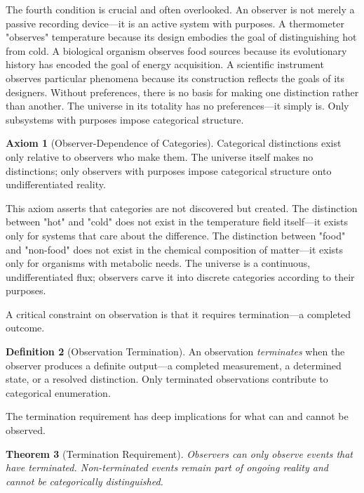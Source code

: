\documentclass[12pt,a4paper]{article}
\newtheorem{theorem}{Theorem}[section]
\theoremstyle{definition}
\newtheorem{definition}[theorem]{Definition}
\newtheorem{axiom}[theorem]{Axiom}
\theoremstyle{remark}
\begin{document}
The fourth condition is crucial and often overlooked. An observer is not merely a passive recording device—it is an active system with purposes. A thermometer "observes" temperature because its design embodies the goal of distinguishing hot from cold. A biological organism observes food sources because its evolutionary history has encoded the goal of energy acquisition. A scientific instrument observes particular phenomena because its construction reflects the goals of its designers. Without preferences, there is no basis for making one distinction rather than another. The universe in its totality has no preferences—it simply is. Only subsystems with purposes impose categorical structure.

\begin{axiom}[Observer-Dependence of Categories]
\label{axiom:observer_dependence}
Categorical distinctions exist only relative to observers who make them. The universe itself makes no distinctions; only observers with purposes impose categorical structure onto undifferentiated reality.
\end{axiom}

This axiom asserts that categories are not discovered but created. The distinction between "hot" and "cold" does not exist in the temperature field itself—it exists only for systems that care about the difference. The distinction between "food" and "non-food" does not exist in the chemical composition of matter—it exists only for organisms with metabolic needs. The universe is a continuous, undifferentiated flux; observers carve it into discrete categories according to their purposes.

A critical constraint on observation is that it requires termination—a completed outcome.

\begin{definition}[Observation Termination]
\label{def:termination}
An observation \emph{terminates} when the observer produces a definite output—a completed measurement, a determined state, or a resolved distinction. Only terminated observations contribute to categorical enumeration.
\end{definition}

The termination requirement has deep implications for what can and cannot be observed.

\begin{theorem}[Termination Requirement]
\label{thm:termination}
Observers can only observe events that have terminated. Non-terminated events remain part of ongoing reality and cannot be categorically distinguished.
\end{theorem}
\end{document}
